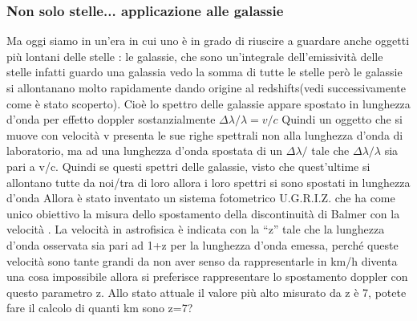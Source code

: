 \documentclass[a4paper,11pt]{article}
\begin{document}
\subsubsection{Non solo stelle... applicazione alle galassie}Ma oggi siamo in un’era in cui uno è in grado di riuscire a guardare anche oggetti più lontani delle stelle : le galassie, che sono un’integrale dell’emissività delle stelle infatti guardo una galassia vedo la somma di tutte le stelle però le galassie si allontanano molto rapidamente dando origine al redshifts(vedi successivamente come è stato scoperto). Cioè lo spettro delle galassie appare spostato in lunghezza d’onda per effetto doppler sostanzialmente
$\Delta \lambda/\lambda = v/c $
Quindi un oggetto che si muove con velocità v presenta le sue righe spettrali non alla lunghezza d’onda di laboratorio, ma ad una lunghezza d’onda spostata di un $\Delta \lambda/$ tale che $\Delta \lambda/\lambda$ sia pari a v/c. Quindi se questi spettri delle galassie, visto che quest’ultime si allontano tutte da noi/tra di loro allora i loro spettri si sono spostati in lunghezza d’onda
Allora è stato inventato un sistema fotometrico U.G.R.I.Z. che ha come unico obiettivo la misura dello spostamento della discontinuità di Balmer con la velocità . La velocità in astrofisica è indicata con la “z” tale che la lunghezza d’onda osservata sia pari ad 1+z per la lunghezza d’onda emessa, perché queste velocità sono tante grandi da non aver senso da rappresentarle in km/h diventa una cosa impossibile allora si preferisce rappresentare lo spostamento doppler con questo parametro z. Allo stato attuale il valore più alto misurato da z è 7, potete fare il calcolo di quanti km sono z=7?








    
\newpage
\end{document}
